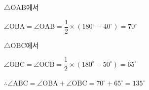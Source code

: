 $\triangle\mathrm{OAB}$에서

$\angle\mathrm{OBA} = \angle\mathrm{OAB} = \dfrac{1}{2}\times (180^\circ - 40^\circ) = 70^\circ$

$\triangle\mathrm{OBC}$에서

$\angle\mathrm{OBC} = \angle\mathrm{OCB} = \dfrac{1}{2}\times (180^\circ - 50^\circ) = 65^\circ$

$\therefore \angle\mathrm{ABC} = \angle\mathrm{OBA} + \angle\mathrm{OBC} = 70^\circ + 65^\circ = 135^\circ$
